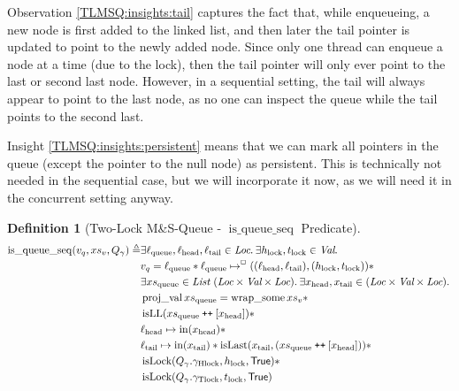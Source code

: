 \documentclass[a4paper, 10pt]{report}
\theoremstyle{definition}
\newtheorem{definition}{Definition}[section]
\newcommand{\isLock}{\operatorname{isLock}}
\newcommand{\msq}{M\&S-Queue\xspace}
\newcommand{\tlmsq}{Two-Lock \msq}
\newcommand{\isqueueseq}{\operatorname{is\_queue\_seq}}
\newcommand{\vq}{v_q}
\newcommand{\xsqueue}{xs_{\mathrm{queue}}}
\newcommand{\isLL}{\operatorname{isLL}}
\newcommand{\projval}{\operatorname{proj\_val}}
\newcommand{\wrapsome}{\operatorname{wrap\_some}}
\newcommand{\isLast}{\operatorname{isLast}}
\newcommand{\locN}[1]{\loc_{\mathrm{#1}}}
\newcommand{\lochead}{\locN{head}}
\newcommand{\loctail}{\locN{tail}}
\newcommand{\locqueue}{\locN{queue}}
\newcommand{\nIn}[1]{\operatorname{in}(#1)}
\newcommand{\node}{x}
\newcommand{\nodeN}[1]{\node_{\mathrm{#1}}}
\newcommand{\nodehead}{\nodeN{head}}
\newcommand{\nodetail}{\nodeN{tail}}
\newcommand{\absvalueList}{xs_v}
\newcommand{\Hlock}{h_{\mathrm{lock}}}
\newcommand{\Tlock}{t_{\mathrm{lock}}}
\newcommand{\Qg}{Q_\gname}
\newcommand{\ghlock}{\gname_{\mathrm{Hlock}}}
\newcommand{\gtlock}{\gname_{\mathrm{Tlock}}}
\newcommand\catenate{\mathbin{\text{\ttfamily\upshape ++}}}
\begin{document}
Observation \ref{TLMSQ:insights:tail} captures the fact that, while enqueueing, a new node is first added to the linked list, and then later the tail pointer is updated to point to the newly added node. Since only one thread can enqueue a node at a time (due to the lock), then the tail pointer will only ever point to the last or second last node. However, in a sequential setting, the tail will always appear to point to the last node, as no one can inspect the queue while the tail points to the second last.

Insight \ref{TLMSQ:insights:persistent} means that we can mark all pointers in the queue (except the pointer to the null node) as persistent. This is technically not needed in the sequential case, but we will incorporate it now, as we will need it in the concurrent setting anyway.

\begin{definition}[\tlmsq{} - $\isqueueseq$ Predicate]\label{TLMSQ:spec:seq:isqueueseq}
\begin{align*}
  \isqueueseq(\vq, \absvalueList, \Qg) \eqdef
  &\Exists \locqueue, \lochead, \loctail \in \Loc . \Exists \Hlock, \Tlock \in \Val . \\
  &\vq = \locqueue \star \locqueue \mapsto^{\persistently} ((\lochead, \loctail), (\Hlock, \Tlock)) \star\\
  &\Exists \xsqueue \in \List ~ (\Loc \times \Val \times \Loc) . \Exists \nodehead, \nodetail \in (\Loc \times \Val \times \Loc) .\\
	&\projval \xsqueue = \wrapsome \absvalueList \star\\
	&\isLL (\xsqueue \catenate [\nodehead]) \star\\
	&\lochead \mapsto \nIn{\nodehead} \star\\
	&\loctail \mapsto \nIn{\nodetail} \star \isLast(\nodetail, (\xsqueue \catenate [\nodehead])) \star\\
	&\isLock(\Qg.\ghlock, \Hlock, \TRUE) \star\\
	&\isLock(\Qg.\gtlock, \Tlock, \TRUE)
\end{align*}
\end{definition}
\end{document}
